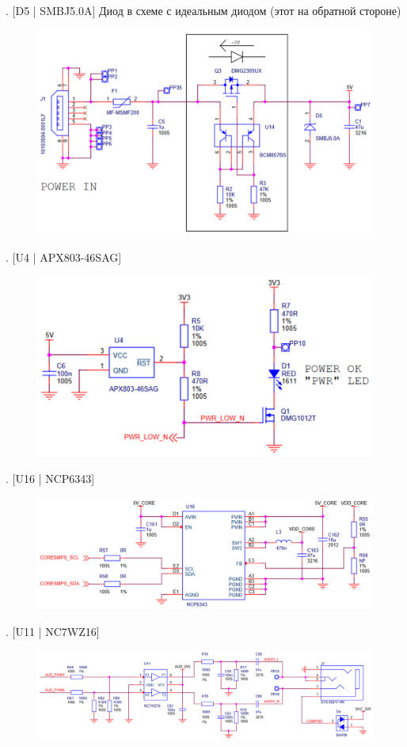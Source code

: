 . [D5 | SMBJ5.0A] Диод в схеме с идеальным диодом (этот на обратной стороне)
\begin{figure}[H]
  \centering
  \includegraphics[width=\textwidth]{img/D5.pdf}
\end{figure}

. [U4 | APX803-46SAG]
\begin{figure}[H]
  \centering
  \includegraphics[width=\textwidth]{img/U4.pdf}
\end{figure}

. [U16 | NCP6343]
\begin{figure}[H]
  \centering
  \includegraphics[width=\textwidth]{img/U16.pdf}
\end{figure}

. [U11 | NC7WZ16]
\begin{figure}[H]
  \centering
  \includegraphics[width=\textwidth]{img/U11.pdf}
\end{figure}



